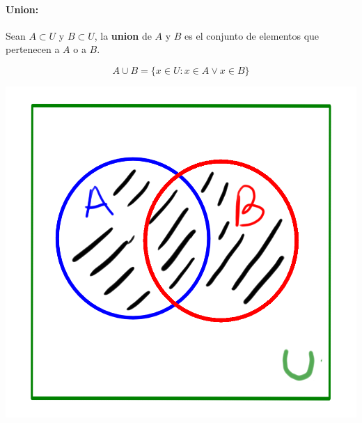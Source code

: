 \paragraph{Union:}
Sean $A\subset U$ y $B\subset U$, la \textbf{union} de $A$ y $B$ es el conjunto de elementos que pertenecen a $A$ o a $B$.
        \begin{center}
    \begin{minipage}{0.4\textwidth}
        \begin{equation*}
            A\cup B = \{x\in U : x\in A \lor x\in B\}
        \end{equation*}
    \end{minipage}
    \begin{minipage}{0.4\textwidth}
         \includegraphics[scale=0.3]{imagenes/union.png}
    \end{minipage}
    \end{center}

